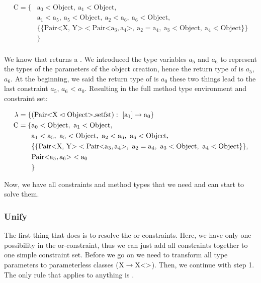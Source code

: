 \begin{align*}
    \text{C} = \{& \text{a}_0 < \text{Object}, \ \text{a}_1 < \text{Object}, \\
    &\text{a}_1 < \text{a}_5, \ \text{a}_5 < \text{Object}, \ \text{a}_2 < \text{a}_6, \ \text{a}_6 < \text{Object}, \\
    & \{ \{ \text{Pair<X, Y>} < \text{Pair<} \text{a}_3, \text{a}_4 \text{>}, \ \text{a}_2 = \text{a}_4, \ \text{a}_3 < \text{Object}, \ \text{a}_4 < \text{Object} \} \} \\
    &\}\\
\end{align*}

We know that  returns a . We introduced the type variables $a_5$ and $a_6$ to represent the types of the parameters of the object creation, hence the return type of  is $a_5$, $a_6$\inl{>}.
At the beginning, we said the return type of  is $a_0$ these two things lead to the last constraint $a_5$, $a_6$\inl{>} < $a_0$.
Resulting in the full method type environment and constraint set:

\begin{align*}
    \lambda = \{& ( \cxnm{Pair}{X}{Object}{setfst} ): \ [\text{a}_1] \to \text{a}_0 \}\\
    \text{C} = \{& \text{a}_0 < \text{Object}, \ \text{a}_1 < \text{Object}, \\
    &\text{a}_1 < \text{a}_5, \ \text{a}_5 < \text{Object}, \ \text{a}_2 < \text{a}_6, \ \text{a}_6 < \text{Object}, \\
    & \{ \{ \text{Pair<X, Y>} < \text{Pair<} \text{a}_3, \text{a}_4 \text{>}, \ \text{a}_2 = \text{a}_4, \ \text{a}_3 < \text{Object}, \ \text{a}_4 < \text{Object} \} \},\\
    &\text{Pair<}\text{a}_5, \text{a}_6\text{>} < \text{a}_0\\
    &\}\\
\end{align*}

Now, we have all constraints and method types that we need and can start to solve them.

\subsubsection{Unify}
The first thing that  does is to resolve the or-constraints. Here, we have only one possibility in the or-constraint, thus we can just add all constraints together to one simple constraint set.
Before we go on we need to transform all type parameters to parameterless classes ($\text{X} \to \text{X} \text{<}  \text{>}$).
Then, we continue with step 1. The only rule that applies to anything is .

